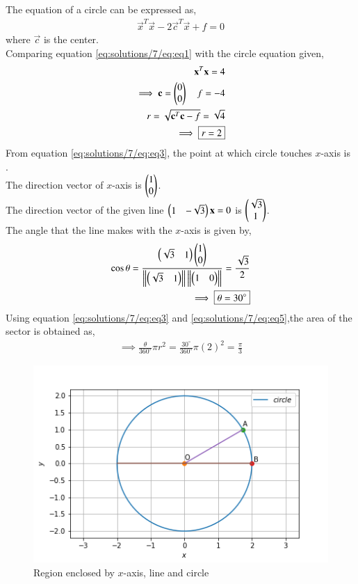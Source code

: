 The equation of a circle can be expressed as,
\begin{align}
    \vec{x}^{T}\vec{x} - 2\vec{c}^{T}\vec{x} +f=0 \label{eq:solutions/7/eq:eq1}
\end{align}
where $\vec{c}$ is the center.\\
Comparing equation \eqref{eq:solutions/7/eq:eq1} with the circle equation given,
\begin{align}
    \mathbf{x}^{T}\mathbf{x} =4 \label{eq:solutions/7/eq:eq2}\\
    \implies \mathbf{c} = \begin{pmatrix}0\\0\end{pmatrix} \quad f=-4\\
    r=\sqrt{\mathbf{c}^{T}\mathbf{c}-f} = \sqrt{4}\\
    \implies \boxed{r=2} \label{eq:solutions/7/eq:eq3}
\end{align}
From equation \eqref{eq:solutions/7/eq:eq3}, the point at which circle touches $x$-axis is .\\
The direction vector of $x$-axis is $\begin{pmatrix}1\\0\end{pmatrix}$.\\
The direction vector of the given line $\begin{pmatrix}1&-\sqrt{3}\end{pmatrix}\mathbf{x}=0$ is $\begin{pmatrix}\sqrt{3}\\1\end{pmatrix}$.\\
The angle that the line makes with the $x$-axis is given by,
\begin{align}
    \cos\theta = \frac{\begin{pmatrix}\sqrt{3}&1\end{pmatrix}\begin{pmatrix}1\\0\end{pmatrix}}{\left\lVert\begin{pmatrix}\sqrt{3}&1\end{pmatrix}\right\rVert\left\lVert\begin{pmatrix}1&0\end{pmatrix}\right\rVert}=\frac{\sqrt{3}}{2} \label{eq:solutions/7/eq:eq4}\\
    \implies \boxed{\theta = 30^{\circ}}\label{eq:solutions/7/eq:eq5}
\end{align}
Using equation \eqref{eq:solutions/7/eq:eq3} and \eqref{eq:solutions/7/eq:eq5},the area of the sector is obtained as,
\begin{align}
    \implies \boxed{\frac{\theta}{360^{\circ}}\pi r^2 = \frac{30^{\circ}}{360^{\circ}}\pi (2)^2=\frac{\pi}{3}} \label{eq:solutions/7/eq:eq6}
\end{align}
\begin{figure}[h!]
	\centering
	\includegraphics[width=\columnwidth]{./solutions/conics/1/7/circle.png}
	\caption{Region enclosed by $x$-axis, line and circle}
	\label{eq:solutions/7/myfig}
\end{figure}\\
